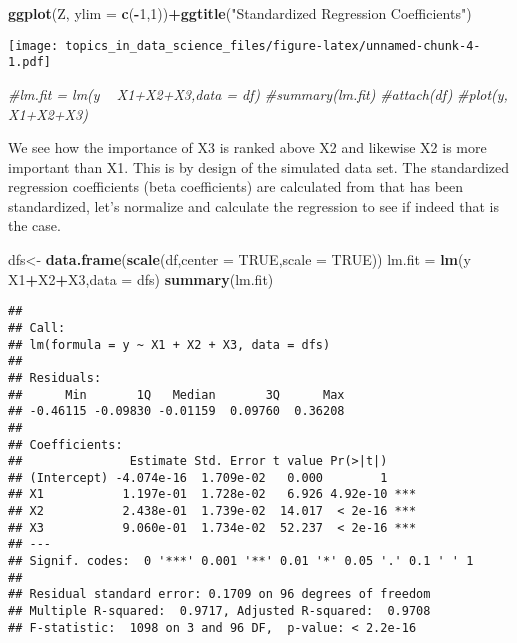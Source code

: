 \documentclass[
  11pt,
]{book}
\newenvironment{Shaded}{\begin{snugshade}}{\end{snugshade}}
\newcommand{\CommentTok}[1]{\textcolor[rgb]{0.56,0.35,0.01}{\textit{#1}}}
\newcommand{\DataTypeTok}[1]{\textcolor[rgb]{0.13,0.29,0.53}{#1}}
\newcommand{\DecValTok}[1]{\textcolor[rgb]{0.00,0.00,0.81}{#1}}
\newcommand{\KeywordTok}[1]{\textcolor[rgb]{0.13,0.29,0.53}{\textbf{#1}}}
\newcommand{\NormalTok}[1]{#1}
\newcommand{\OperatorTok}[1]{\textcolor[rgb]{0.81,0.36,0.00}{\textbf{#1}}}
\newcommand{\OtherTok}[1]{\textcolor[rgb]{0.56,0.35,0.01}{#1}}
\newcommand{\StringTok}[1]{\textcolor[rgb]{0.31,0.60,0.02}{#1}}
\begin{document}
\begin{Shaded}
\begin{Highlighting}[]
\KeywordTok{ggplot}\NormalTok{(Z, }\DataTypeTok{ylim =} \KeywordTok{c}\NormalTok{(}\OperatorTok{-}\DecValTok{1}\NormalTok{,}\DecValTok{1}\NormalTok{))}\OperatorTok{+}\KeywordTok{ggtitle}\NormalTok{(}\StringTok{"Standardized Regression Coefficients"}\NormalTok{)}
\end{Highlighting}
\end{Shaded}

\texttt{[image: topics\_in\_data\_science\_files/figure-latex/unnamed-chunk-4-1.pdf]}

\begin{Shaded}
\begin{Highlighting}[]
\CommentTok{#lm.fit = lm(y ~ X1+X2+X3,data = df)}
\CommentTok{#summary(lm.fit)}
\CommentTok{#attach(df)}
\CommentTok{#plot(y, X1+X2+X3)}
\end{Highlighting}
\end{Shaded}

We see how the importance of X3 is ranked above X2 and likewise X2 is more important than X1. This is by design of the simulated data set. The standardized regression coefficients (beta coefficients) are calculated from that has been standardized, let's normalize and calculate the regression to see if indeed that is the case.

\begin{Shaded}
\begin{Highlighting}[]
\NormalTok{dfs<-}\StringTok{ }\KeywordTok{data.frame}\NormalTok{(}\KeywordTok{scale}\NormalTok{(df,}\DataTypeTok{center =} \OtherTok{TRUE}\NormalTok{,}\DataTypeTok{scale =} \OtherTok{TRUE}\NormalTok{))}
\NormalTok{lm.fit =}\StringTok{ }\KeywordTok{lm}\NormalTok{(y }\OperatorTok{~}\StringTok{ }\NormalTok{X1}\OperatorTok{+}\NormalTok{X2}\OperatorTok{+}\NormalTok{X3,}\DataTypeTok{data =}\NormalTok{ dfs)}
\KeywordTok{summary}\NormalTok{(lm.fit)}
\end{Highlighting}
\end{Shaded}

\begin{verbatim}
## 
## Call:
## lm(formula = y ~ X1 + X2 + X3, data = dfs)
## 
## Residuals:
##      Min       1Q   Median       3Q      Max 
## -0.46115 -0.09830 -0.01159  0.09760  0.36208 
## 
## Coefficients:
##               Estimate Std. Error t value Pr(>|t|)    
## (Intercept) -4.074e-16  1.709e-02   0.000        1    
## X1           1.197e-01  1.728e-02   6.926 4.92e-10 ***
## X2           2.438e-01  1.739e-02  14.017  < 2e-16 ***
## X3           9.060e-01  1.734e-02  52.237  < 2e-16 ***
## ---
## Signif. codes:  0 '***' 0.001 '**' 0.01 '*' 0.05 '.' 0.1 ' ' 1
## 
## Residual standard error: 0.1709 on 96 degrees of freedom
## Multiple R-squared:  0.9717, Adjusted R-squared:  0.9708 
## F-statistic:  1098 on 3 and 96 DF,  p-value: < 2.2e-16
\end{verbatim}
\end{document}
